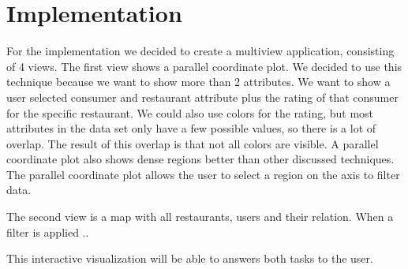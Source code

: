 \section{Implementation}\label{sec:implemenation}

For the implementation we decided to create a multiview application, consisting of 4 views.
The first view shows a parallel coordinate plot.
We decided to use this technique because we want to show more than 2 attributes.
We want to show a user selected consumer and restaurant attribute plus the rating of that consumer for the specific restaurant.
We could also use colors for the rating, but most attributes in the data set only have a few possible values, so there is a lot of overlap.
The result of this overlap is that not all colors are visible.
A parallel coordinate plot also shows dense regions better than other discussed techniques.
The parallel coordinate plot allows the user to select a region on the axis to filter data.

The second view is a map with all restaurants, users and their relation.
When a filter is applied ..

This interactive visualization will be able to answers both tasks to the user.




